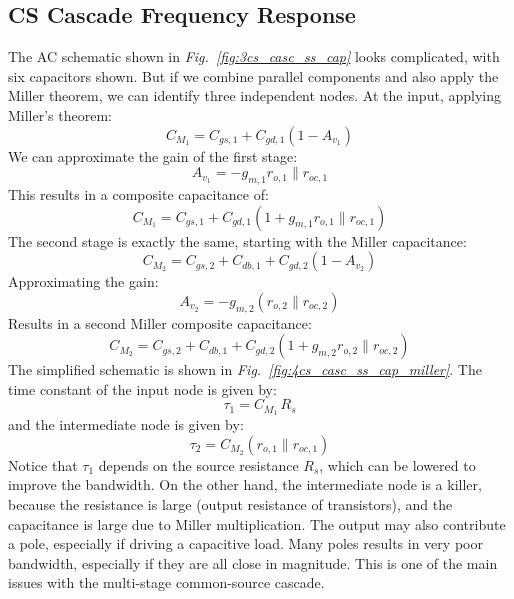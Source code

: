 \subsection{CS Cascade Frequency Response}
The AC schematic shown in \emph{Fig.~\ref{fig:3cs_casc_ss_cap}} looks complicated, with six capacitors shown.  But if we combine parallel components and also apply the Miller theorem, we can identify three independent nodes.  At the input, applying Miller's theorem:
    \begin{equation} 
        C_{M_1} = C_{gs,1} + C_{gd,1} (1 - A_{v_1})
    \end{equation}
We can approximate the gain of the first stage:
    \begin{equation} 
        A_{v_1} = -g_{m,1} r_{o,1} \parallel r_{oc,1}
    \end{equation}
This results in a composite capacitance of:
    \begin{equation} 
        C_{M_1} = C_{gs,1} + C_{gd,1} (1 + g_{m,1} r_{o,1} \parallel r_{oc,1})
    \end{equation}
The second stage is exactly the same, starting with the Miller capacitance:
    \begin{equation} 
        C_{M_2} = C_{gs,2} + C_{db,1} + C_{gd,2} (1 - A_{v_2})
    \end{equation}
Approximating the gain:
    \begin{equation} 
        A_{v_2} = -g_{m,2} (r_{o,2} \parallel r_{oc,2})
    \end{equation}
Results in a second Miller composite capacitance:
    \begin{equation} 
        C_{M_2} = C_{gs,2} + C_{db,1} + C_{gd,2} (1 + g_{m,2} r_{o,2} \parallel r_{oc,2})
    \end{equation}
The simplified schematic is shown in \emph{Fig.~\ref{fig:4cs_casc_ss_cap_miller}}.  The time constant of the input node is given by:
    \begin{equation}
        \tau_1 = C_{M_1}\,R_s
    \end{equation}
and the intermediate node is given by:
    \begin{equation} 
        \tau_2 = C_{M_2}(r_{o,1} \parallel r_{oc,1})
    \end{equation}
Notice that $\tau_1$ depends on the source resistance $R_s$, which can be lowered to improve the bandwidth.  On the other hand,  the intermediate node is a killer, because the resistance is large (output resistance of transistors), and the capacitance is large due to Miller multiplication.  The output may also contribute a pole, especially if driving a capacitive load.  Many poles results in very poor bandwidth, especially if they are all close in magnitude.  This is one of the main issues with the multi-stage common-source cascade.
